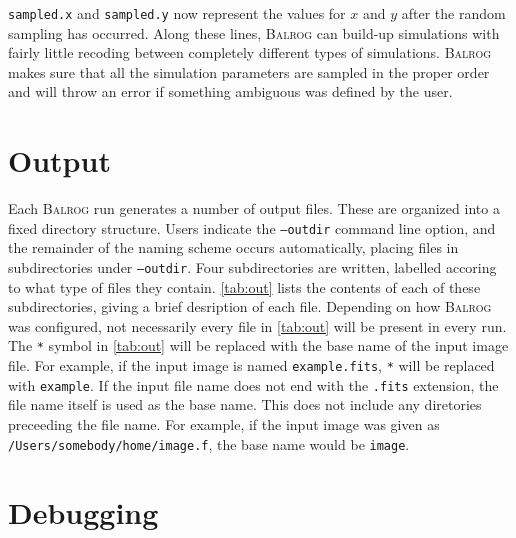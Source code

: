 \documentclass[12pt]{article}
\newcommand{\balrog}{\textsc{Balrog}}
\newcommand{\opt}[1]{\texttt{--#1}}
\begin{document}
\noindent \texttt{sampled.x} and \texttt{sampled.y} now represent the values
for $x$ and $y$ after the random sampling has occurred. 
Along these lines, \balrog{} can build-up simulations with fairly little recoding between completely
different types of simulations.
\balrog{} makes sure that all the simulation parameters are sampled
in the proper order and will throw an error if something ambiguous was defined
by the user.


\section{Output}
Each \balrog{} run generates a number of output files. 
These are organized into a fixed directory structure.
Users indicate the \opt{outdir} command line option, and
the remainder of the naming scheme occurs automatically,
placing files in subdirectories under \opt{outdir}.
Four subdirectories are written, labelled accoring to what
type of files they contain. \autoref{tab:out}
lists the contents of each of these subdirectories,
giving a brief desription of each file. Depending on how
\balrog{} was configured, not necessarily every file
in \autoref{tab:out} will be present in every run.
The \texttt{*} symbol in \autoref{tab:out} will be replaced with
the base name of the input image file. For example,
if the input image is named \texttt{example.fits},
\texttt{*} will be replaced with \texttt{example}.
If the input file name does not end with the \texttt{.fits}
extension, the file name itself is used as the base name.
This does not include any diretories preceeding the file name.
For example, if the input image was given as
\texttt{/Users/somebody/home/image.f}, the
base name would be \texttt{image}.

\outtab{}

\section{Debugging}
\label{sec:debug}
\end{document}
